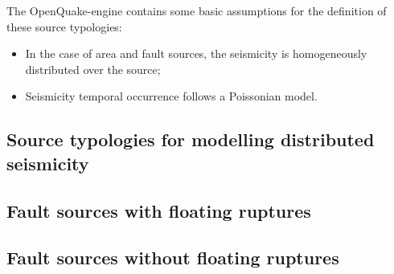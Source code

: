 The OpenQuake-engine contains some basic assumptions for the definition of
these source typologies:

\begin{itemize}

    \item In the case of area and fault sources, the seismicity is
    homogeneously distributed over the source;

    \item Seismicity temporal occurrence follows a Poissonian model.

\end{itemize}



\subsection{Source typologies for modelling distributed seismicity}


\subsection{Fault sources with floating ruptures}


\subsection{Fault sources without floating ruptures}

